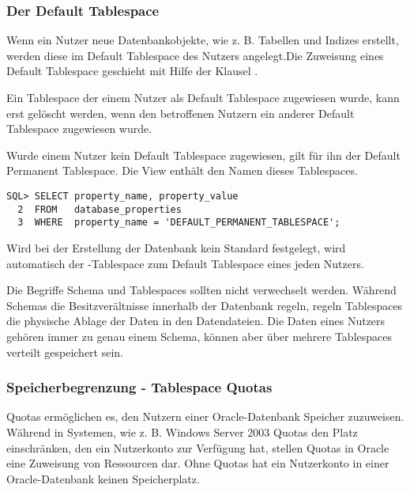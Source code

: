         \subsubsection{Der Default Tablespace}
          Wenn ein Nutzer neue Datenbankobjekte, wie z. B. Tabellen und Indizes erstellt, werden diese im Default Tablespace des Nutzers angelegt.Die Zuweisung eines Default Tablespace geschieht mit Hilfe der Klausel .
          \begin{merke}
            Ein Tablespace der einem Nutzer als Default Tablespace zugewiesen wurde, kann erst gel\"oscht werden, wenn den betroffenen Nutzern ein anderer Default Tablespace zugewiesen wurde.
          \end{merke}
          Wurde einem Nutzer kein Default Tablespace zugewiesen, gilt f\"ur ihn der Default Permanent Tablespace. Die View  enth\"alt den Namen dieses Tablespaces.
          \begin{lstlisting}[caption={Der Default Permanent
          Tablespace},label=admin201,language=oracle_sql]
SQL> SELECT property_name, property_value
  2  FROM   database_properties
  3  WHERE  property_name = 'DEFAULT_PERMANENT_TABLESPACE';
          \end{lstlisting}
          \begin{merke}
            Wird bei der Erstellung der Datenbank kein Standard festgelegt, wird automatisch der -Tablespace zum Default Tablespace eines jeden Nutzers.
          \end{merke}
          Die Begriffe Schema und Tablespaces sollten nicht verwechselt werden. W\"ahrend Schemas die Besitzver\"altnisse innerhalb der Datenbank regeln, regeln Tablespaces die physische Ablage der Daten in den Datendateien. Die Daten eines Nutzers geh\"oren immer zu genau einem Schema, k\"onnen aber \"uber mehrere Tablespaces verteilt gespeichert sein.
        \subsubsection{Speicherbegrenzung - Tablespace Quotas}
          Quotas erm\"oglichen es, den Nutzern einer Oracle-Datenbank Speicher zuzuweisen. W\"ahrend in Systemen, wie z. B. Windows Server 2003 Quotas den Platz einschr\"anken, den ein Nutzerkonto zur Verf\"ugung hat, stellen Quotas in Oracle eine Zuweisung von Ressourcen dar. Ohne Quotas hat ein Nutzerkonto in einer Oracle-Datenbank keinen Speicherplatz.

